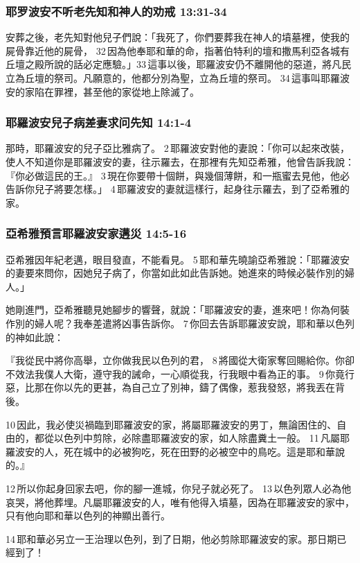 \subsubsection{耶罗波安不听老先知和神人的劝戒 13:31-34}
安葬之後，老先知對他兒子們說：「我死了，你們要葬我在神人的墳墓裡，使我的屍骨靠近他的屍骨， 32 因為他奉耶和華的命，指著伯特利的壇和撒馬利亞各城有丘壇之殿所說的話必定應驗。」33 這事以後，耶羅波安仍不離開他的惡道，將凡民立為丘壇的祭司。凡願意的，他都分別為聖，立為丘壇的祭司。 34 這事叫耶羅波安的家陷在罪裡，甚至他的家從地上除滅了。


\subsubsection{耶羅波安兒子病差妻求问先知 14:1-4}
那時，耶羅波安的兒子亞比雅病了。 2 耶羅波安對他的妻說：「你可以起來改裝，使人不知道你是耶羅波安的妻，往示羅去，在那裡有先知亞希雅，他曾告訴我說：『你必做這民的王。』 3 現在你要帶十個餅，與幾個薄餅，和一瓶蜜去見他，他必告訴你兒子將要怎樣。」 4 耶羅波安的妻就這樣行，起身往示羅去，到了亞希雅的家。

\subsubsection{亞希雅預言耶羅波安家遘災 14:5-16}
亞希雅因年紀老邁，眼目發直，不能看見。 5 耶和華先曉諭亞希雅說：「耶羅波安的妻要來問你，因她兒子病了，你當如此如此告訴她。她進來的時候必裝作別的婦人。」

她剛進門，亞希雅聽見她腳步的響聲，就說：「耶羅波安的妻，進來吧！你為何裝作別的婦人呢？我奉差遣將凶事告訴你。 7 你回去告訴耶羅波安說，耶和華以色列的神如此說：

『我從民中將你高舉，立你做我民以色列的君， 8 將國從大衛家奪回賜給你。你卻不效法我僕人大衛，遵守我的誡命，一心順從我，行我眼中看為正的事。 9 你竟行惡，比那在你以先的更甚，為自己立了別神，鑄了偶像，惹我發怒，將我丟在背後。 

10 因此，我必使災禍臨到耶羅波安的家，將屬耶羅波安的男丁，無論困住的、自由的，都從以色列中剪除，必除盡耶羅波安的家，如人除盡糞土一般。 11 凡屬耶羅波安的人，死在城中的必被狗吃，死在田野的必被空中的鳥吃。這是耶和華說的。』 

12 所以你起身回家去吧，你的腳一進城，你兒子就必死了。 13 以色列眾人必為他哀哭，將他葬埋。凡屬耶羅波安的人，唯有他得入墳墓，因為在耶羅波安的家中，只有他向耶和華以色列的神顯出善行。 

14 耶和華必另立一王治理以色列，到了日期，他必剪除耶羅波安的家。那日期已經到了！ 

